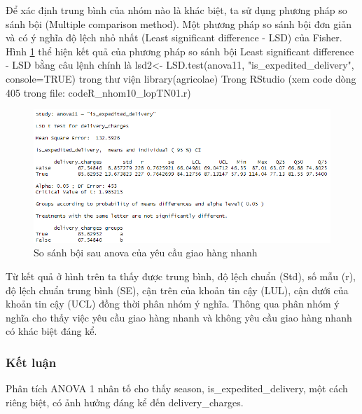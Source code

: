 Để xác định trung bình của nhóm nào là khác biệt, ta sử dụng phương pháp so sánh bội (Multiple comparison method). Một phương pháp so sánh bội đơn giản và có ý nghĩa độ lệch nhỏ nhất (Least significant difference - LSD) của Fisher. Hình \ref{fig:5.4} thể hiện kết quả của phương pháp so sánh bội Least significant difference - LSD bằng câu lệnh chính là lsd2<- LSD.test(anova11, "is_expedited_delivery", console=TRUE)
trong thư viện library(agricolae) Trong RStudio (xem code dòng 405 trong file: codeR\_nhom10\_lopTN01.r)
\begin{figure}[!htbp]
    \centering
    \includegraphics[width=0.6\linewidth]{graphics/5.3.4.png}
    \caption{So sánh bội sau anova của yêu cầu giao hàng nhanh}
    \label{fig:5.4}
\end{figure}
Từ kết quả ở hình trên ta thấy được trung bình, độ lệch chuẩn (Std), số mẫu (r), độ lệch chuẩn trung bình (SE), cận trên của khoản tin cậy (LUL), cận dưới của khoản tin cậy (UCL) đồng thời phân nhóm ý nghĩa. Thông qua phân nhóm ý nghĩa cho thấy việc yêu cầu giao hàng nhanh và không yêu cầu giao hàng nhanh có khác biệt đáng kể.

\subsubsection{Kết luận}
Phân tích ANOVA 1 nhân tố cho thấy season, is\_expedited\_delivery, một cách riêng biệt, có ảnh hưởng đáng kể đến delivery\_charges.